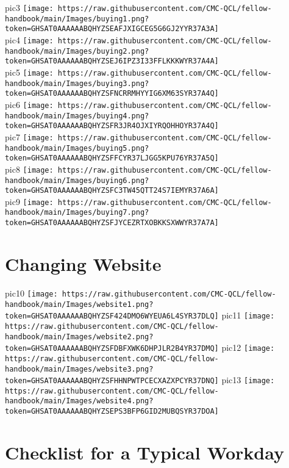 \documentclass[
]{book}
\begin{document}
pic3
\texttt{[image: https://raw.githubusercontent.com/CMC-QCL/fellow-handbook/main/Images/buying1.png?token=GHSAT0AAAAAABQHYZSEAFJXIGCEG5G6GJ2YYR37A3A]}\\
pic4
\texttt{[image: https://raw.githubusercontent.com/CMC-QCL/fellow-handbook/main/Images/buying2.png?token=GHSAT0AAAAAABQHYZSEJ6IPZ3I33FFLKKKWYR37A4A]}\\
pic5
\texttt{[image: https://raw.githubusercontent.com/CMC-QCL/fellow-handbook/main/Images/buying3.png?token=GHSAT0AAAAAABQHYZSFNCRRMHYYIG6XM63SYR37A4Q]}\\
pic6
\texttt{[image: https://raw.githubusercontent.com/CMC-QCL/fellow-handbook/main/Images/buying4.png?token=GHSAT0AAAAAABQHYZSFR3JR4OJXIYRQOHHOYR37A4Q]}\\
pic7
\texttt{[image: https://raw.githubusercontent.com/CMC-QCL/fellow-handbook/main/Images/buying5.png?token=GHSAT0AAAAAABQHYZSFFCYR37LJGG5KPU76YR37A5Q]}\\
pic8
\texttt{[image: https://raw.githubusercontent.com/CMC-QCL/fellow-handbook/main/Images/buying6.png?token=GHSAT0AAAAAABQHYZSFC3TW45QTT24S7IEMYR37A6A]}\\
pic9
\texttt{[image: https://raw.githubusercontent.com/CMC-QCL/fellow-handbook/main/Images/buying7.png?token=GHSAT0AAAAAABQHYZSFJYCEZRTXOBKKSXWWYR37A7A]}

\hypertarget{changing-website}{%
\section{Changing Website}\label{changing-website}}

pic10
\texttt{[image: https://raw.githubusercontent.com/CMC-QCL/fellow-handbook/main/Images/website1.png?token=GHSAT0AAAAAABQHYZSF424DMO6WYEUA6L4SYR37DLQ]}
pic11
\texttt{[image: https://raw.githubusercontent.com/CMC-QCL/fellow-handbook/main/Images/website2.png?token=GHSAT0AAAAAABQHYZSFDBFXWK6DHPJLR2B4YR37DMQ]}
pic12
\texttt{[image: https://raw.githubusercontent.com/CMC-QCL/fellow-handbook/main/Images/website3.png?token=GHSAT0AAAAAABQHYZSFHHNPWTPCECXAZXPCYR37DNQ]}
pic13
\texttt{[image: https://raw.githubusercontent.com/CMC-QCL/fellow-handbook/main/Images/website4.png?token=GHSAT0AAAAAABQHYZSEPS3BFP6GID2MUBQSYR37DOA]}

\hypertarget{checklist-for-a-typical-workday}{%
\section{Checklist for a Typical Workday}\label{checklist-for-a-typical-workday}}
\end{document}
